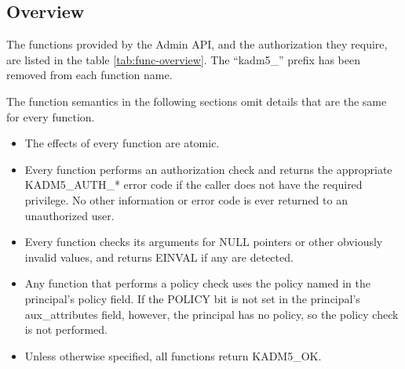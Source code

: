 \subsection{Overview}

The functions provided by the Admin API, and the authorization they
require, are listed in the table \ref{tab:func-overview}.  The
``kadm5_'' prefix has been removed from each function name.

The function semantics in the following sections omit details that are
the same for every function.

\begin{itemize}
\item The effects of every function are atomic.

\item Every function performs an authorization check and returns
the appropriate KADM5_AUTH_* error code if the caller does not
have the required privilege.  No other information or error code is
ever returned to an unauthorized user.

\item Every function checks its arguments for NULL pointers or other
obviously invalid values, and returns EINVAL if any are detected.

\item Any function that performs a policy check uses the policy named
in the principal's policy field.  If the POLICY bit is not set in the
principal's aux_attributes field, however, the principal has no
policy, so the policy check is not performed.

\item Unless otherwise specified, all functions return KADM5_OK.
\end{itemize}


